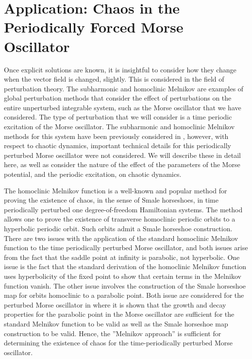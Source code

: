 \documentclass{ws-ijbc}
\begin{document}
\section{Application: Chaos in the Periodically Forced Morse Oscillator}
\label{sec:app}


Once explicit solutions are known, it is insightful to consider how they change when the vector field is changed, slightly. This is considered in the field of perturbation theory. The subharmonic and homoclinic Melnikov 
\cite{wiggins1990introduction} are examples of global perturbation methods that consider the effect of perturbations on the entire unperturbed integrable system, such as the Morse oscillator that we have considered. The type of perturbation that we will consider is a time periodic excitation of the Morse oscillator. The subharmonic and homoclinic Melnikov methods for this system have been previously considered in \cite{guo2003dynamical}, however, with respect to chaotic dynamics, important technical details for this periodically perturbed Morse oscillator were not considered. We will describe these in detail here, as well as consider the nature of the effect of the parameters of the Morse potential, and the periodic excitation, on chaotic dynamics.

The homoclinic Melnikov function is a well-known and popular method for proving the existence of chaos, in the sense of Smale horseshoes, in time periodically perturbed one degree-of-freedom Hamiltonian systems. The method allows one to prove the existence of transverse homoclinic periodic orbits to a hyperbolic periodic orbit. Such orbits admit a Smale horseshoe construction. There are two issues with the application of the standard homoclinic Melnikov function to the time periodically perturbed Morse oscillator, and  both issues arise from the fact that the saddle point at infinity is parabolic, not hyperbolic. One issue is the fact that the standard derivation of the homoclinic Melnikov function uses hyperbolicity of the fixed point to show that certain terms in the Melnikov function vanish. The other issue involves the construction of the Smale horseshoe map for orbits homoclinic to a parabolic point. Both issue are considered for the perturbed Morse oscillator in \cite{beigie1992dynamics} where it is shown that the growth and decay properties for the parabolic point in the Morse oscillator are sufficient for the standard Melnikov function to be valid as well as the Smale horseshoe map construction to be valid. Hence, the ''Melnikov approach'' is sufficient for determining the existence of chaos for the time-periodically perturbed Morse oscillator. 
\end{document}
